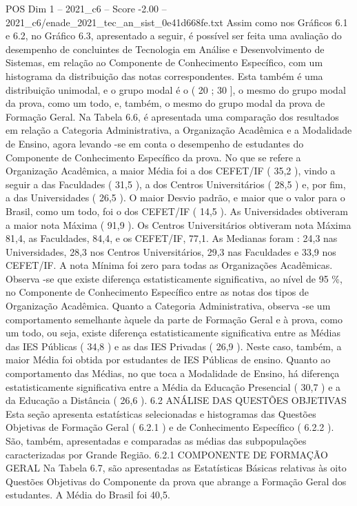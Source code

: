 \begin{textsample}{POS Dim 1 – 2021\_c6 – Score -2.00 – 2021\_c6/enade\_2021\_tec\_an\_sist\_0e41d668fe.txt}
Assim como nos Gráficos 6.1 e 6.2, no Gráfico 6.3, apresentado a seguir, é possível ser feita uma avaliação do desempenho de concluintes de Tecnologia em Análise e Desenvolvimento de Sistemas, em relação ao Componente de Conhecimento Específico, com um histograma da distribuição das notas correspondentes.
Esta também é uma distribuição unimodal, e o grupo modal é o ( 20 ; 30 ], o mesmo do grupo modal da prova, como um todo, e, também, o mesmo do grupo modal da prova de Formação Geral.
Na Tabela 6.6, é apresentada uma comparação dos resultados em relação a Categoria Administrativa, a Organização Acadêmica e a Modalidade de Ensino, agora levando -se em conta o desempenho de estudantes do Componente de Conhecimento Específico da prova.
No que se refere a Organização Acadêmica, a maior Média foi a dos CEFET/IF ( 35,2 ), vindo a seguir a das Faculdades ( 31,5 ), a dos Centros Universitários ( 28,5 ) e, por fim, a das Universidades ( 26,5 ).
O maior Desvio padrão, e maior que o valor para o Brasil, como um todo, foi o dos CEFET/IF ( 14,5 ).
As Universidades obtiveram a maior nota Máxima ( 91,9 ).
Os Centros Universitários obtiveram nota Máxima 81,4, as Faculdades, 84,4, e os CEFET/IF, 77,1.
As Medianas foram : 24,3 nas Universidades, 28,3 nos Centros Universitários, 29,3 nas Faculdades e 33,9 nos CEFET/IF.
A nota Mínima foi zero para todas as Organizações Acadêmicas.
Observa -se que existe diferença estatisticamente significativa, ao nível de 95 \%, no Componente de Conhecimento Específico entre as notas dos tipos de Organização Acadêmica.
Quanto a Categoria Administrativa, observa -se um comportamento semelhante àquele da parte de Formação Geral e à prova, como um todo, ou seja, existe diferença estatisticamente significativa entre as Médias das IES Públicas ( 34,8 ) e as das IES Privadas ( 26,9 ).
Neste caso, também, a maior Média foi obtida por estudantes de IES Públicas de ensino.
Quanto ao comportamento das Médias, no que toca a Modalidade de Ensino, há diferença estatisticamente significativa entre a Média da Educação Presencial ( 30,7 ) e a da Educação a Distância ( 26,6 ). 6.2 ANÁLISE DAS QUESTÕES OBJETIVAS Esta seção apresenta estatísticas selecionadas e histogramas das Questões Objetivas de Formação Geral ( 6.2.1 ) e de Conhecimento Específico ( 6.2.2 ).
São, também, apresentadas e comparadas as médias das subpopulações caracterizadas por Grande Região. 6.2.1 COMPONENTE DE FORMAÇÃO GERAL Na Tabela 6.7, são apresentadas as Estatísticas Básicas relativas às oito Questões Objetivas do Componente da prova que abrange a Formação Geral dos estudantes.
A Média do Brasil foi 40,5.

\end{textsample}

